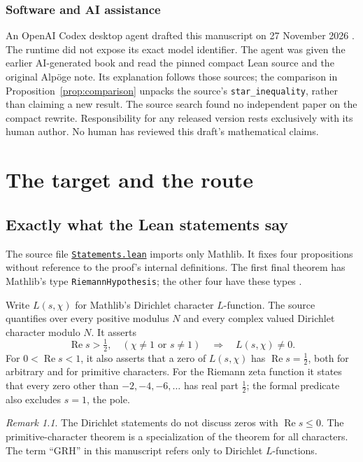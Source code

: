 \documentclass[11pt,oneside,openany]{amsbook}
\theoremstyle{remark}
\newtheorem{remark}[theorem]{Remark}
\numberwithin{equation}{section}
\newcommand{\re}{\operatorname{Re}}
\newcommand{\ghroot}{https://github.com/lsernau/grh-lean/blob/}
\newcommand{\ghrev}{72fead102f663d5c7a407964a13dc0cf9d977207}
\newcommand{\leanfile}[2]{%
  \href{\ghroot\ghrev/grh-compact/src/#1}{\nolinkurl{#2}}}
\begin{document}
\subsection*{Software and AI assistance}
An OpenAI Codex desktop agent drafted this manuscript on
27 November 2026 \cite[\href{https://openai.com/codex}{product
page}]{OpenAICodex}. The runtime did not expose its exact model
identifier. The agent was given the earlier AI-generated book and
read the pinned compact Lean source and the original Alp\"oge note.
Its explanation follows those sources; the comparison in
Proposition~\ref{prop:comparison} unpacks the source's
\texttt{star\_inequality}, rather than claiming a new result.
The source search found no independent paper on the compact rewrite.
Responsibility for any released version rests exclusively with its
human author. No human has reviewed this draft's mathematical claims.

\chapter{The target and the route}
\label{ch:target}
\section{Exactly what the Lean statements say}
\label{sec:statements}
The source file \leanfile{Statements.lean}{Statements.lean} imports
only Mathlib. It fixes four propositions without reference to the
proof's internal definitions. The first final theorem has Mathlib's
type \texttt{RiemannHypothesis}; the other four have these types
\cite[\texttt{src/Statements.lean} and
\texttt{src/Main.lean}]{Sernau2026}.

Write $L(s,\chi)$ for Mathlib's Dirichlet character $L$-function.
The source quantifies over every positive modulus $N$ and every
complex valued Dirichlet character modulo $N$. It asserts
\begin{equation}
\label{eq:nonvanishing}
\re s>\tfrac12,\quad (\chi\ne1\text{ or }s\ne1)
\quad\Longrightarrow\quad L(s,\chi)\ne0.
\end{equation}
For $0<\re s<1$, it also asserts that a zero of $L(s,\chi)$ has
$\re s=\tfrac12$, both for arbitrary and for primitive characters.
For the Riemann zeta function it states that every zero other than
$-2,-4,-6,\ldots$ has real part $\tfrac12$; the formal predicate
also excludes $s=1$, the pole.

\begin{remark}
\label{rem:scope}
The Dirichlet statements do not discuss zeros with $\re s\le0$.
The primitive-character theorem is a specialization of the theorem
for all characters. The term ``GRH'' in this manuscript refers only
to Dirichlet $L$-functions.
\end{remark}
\end{document}
